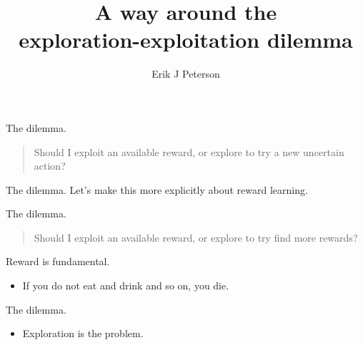\documentclass[10pt]{beamer}
\title{A way around the\\ exploration-exploitation dilemma}
\date{}
\author{Erik J Peterson}
\institute{Research fellow | CoAxLab\\
Carnegie Mellon University\\
\url{robotpuggle.com}}
\begin{document}
\maketitle


    

\begin{frame}[fragile]{The dilemma.}
    \begin{quote}
        Should I exploit an available reward, or explore to try a new uncertain action? 
    \end{quote}
\end{frame}

\begin{frame}[fragile]{The dilemma.}
Let's make this more explicitly about reward learning.
\end{frame}

\begin{frame}[fragile]{The dilemma.}
    \begin{quote}
        Should I exploit an available reward, or explore to try find more rewards? 
    \end{quote}
\end{frame}

\begin{frame}[fragile]{Reward is fundamental.}
\begin{itemize}
    \item If you do not eat and drink and so on, you die.
\end{itemize}
\end{frame}

\begin{frame}[fragile]{The dilemma.}
\begin{itemize}
    \item Exploration is the problem.
\end{itemize}
\end{frame}
\end{document}
